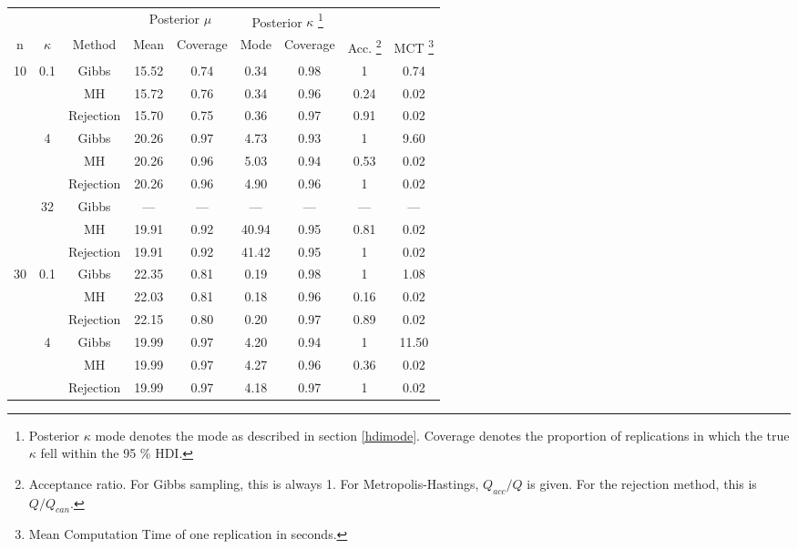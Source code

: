 {\footnotesize
\begin{tabular}{ccccccccc}
  \toprule 
 &&& \multicolumn{2}{c}{Posterior $\mu$} & \multicolumn{2}{c}{Posterior $\kappa$ \footnote{Posterior $\kappa$ mode denotes the mode as described in section \ref{hdimode}. Coverage denotes the proportion of replications in which the true $\kappa$ fell within the 95 \% HDI.} }&  \\
   n & $\kappa$ & Method & Mean & Coverage & Mode & Coverage
                                            & Acc. \footnote{Acceptance ratio. For Gibbs sampling, this is always 1. For Metropolis-Hastings, $Q_{acc}/Q$ is given. For the rejection method, this is $Q/Q_{can}$.} & MCT \footnote{Mean Computation Time of one replication in seconds.} \\
 \midrule 
 10 & 0.1 & Gibbs & 15.52 & 0.74 & 0.34 & 0.98 & 1 & 0.74 \\ 
   &  & MH & 15.72 & 0.76 & 0.34 & 0.96 & 0.24 & 0.02 \\ 
   \vspace{0.2cm} &  & Rejection & 15.70 & 0.75 & 0.36 & 0.97 & 0.91 & 0.02 \\ 
   & 4 & Gibbs & 20.26 & 0.97 & 4.73 & 0.93 & 1 & 9.60 \\ 
   &  & MH & 20.26 & 0.96 & 5.03 & 0.94 & 0.53 & 0.02 \\ 
   \vspace{0.2cm} &  & Rejection & 20.26 & 0.96 & 4.90 & 0.96 & 1 & 0.02 \\ 
   & 32 & Gibbs & --- & --- & --- & --- & --- & --- \\ 
   &  & MH & 19.91 & 0.92 & 40.94 & 0.95 & 0.81 & 0.02 \\ 
   &  & Rejection & 19.91 & 0.92 & 41.42 & 0.95 & 1 & 0.02 \\ 
   \cmidrule{1-9}30 & 0.1 & Gibbs & 22.35 & 0.81 & 0.19 & 0.98 & 1 & 1.08 \\ 
   &  & MH & 22.03 & 0.81 & 0.18 & 0.96 & 0.16 & 0.02 \\ 
   \vspace{0.2cm} &  & Rejection & 22.15 & 0.80 & 0.20 & 0.97 & 0.89 & 0.02 \\ 
   & 4 & Gibbs & 19.99 & 0.97 & 4.20 & 0.94 & 1 & 11.50 \\ 
   &  & MH & 19.99 & 0.97 & 4.27 & 0.96 & 0.36 & 0.02 \\ 
   \vspace{0.2cm} &  & Rejection & 19.99 & 0.97 & 4.18 & 0.97 & 1 & 0.02 \\ 

\end{tabular}}
